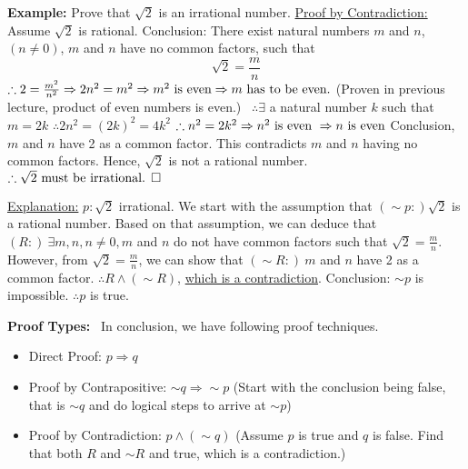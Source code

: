 \documentclass[letterpaper]{article}
\begin{document}
\textbf{Example:} Prove that $\sqrt{2}$ is an irrational number.
    \newline
    \underline{Proof by Contradiction:}~ Assume $\sqrt{2}$ is rational.
    \newline
    Conclusion: There exist natural numbers $m$ and $n$, $(n\neq 0)$, $m$ and $n$ have no common factors, such that
    \begin{equation*}
        \sqrt{2} = \frac{m}{n}
    \end{equation*}
    \newline
    $\therefore 2 = \frac{m^2}{n^2} \Rightarrow 2n^2 = m^2 \Rightarrow m^2\textnormal{ is even} \Rightarrow m \textnormal{ has to be even.}$ (Proven in previous lecture, product of even numbers is even.)\
    \newline
    $\therefore \exists$ a natural number $k$ such that $m=2k$
    \newline
    $\therefore 2n^2 = (2k)^2 = 4k^2$
    \newline
    $\therefore n^2 = 2k^2 \Rightarrow n^2 \textnormal{ is even } \Rightarrow n \textnormal{ is even}$
    \newline
    Conclusion, $m$ and $n$ have 2 as a common factor. This contradicts $m$ and $n$ having no common factors.
    \newline
    Hence, $\sqrt{2}$ is not a rational number.
    \newline
    $\therefore \sqrt{2} \textnormal{ must be irrational. } \square$


    \underline{Explanation:}
    \newline
    $p: \sqrt{2}$ irrational.
    \newline
    We start with the assumption that $(\sim p:) \sqrt{2}$ is a rational number.
    \newline
    Based on that assumption, we can deduce that $(R:)\ \exists m,n, n\neq 0, m$ and $n$ do not have common factors such that $\sqrt{2}=\frac{m}{n}$.
    \newline
    However, from $\sqrt{2}=\frac{m}{n}$, we can show that $(\sim R:)\ m$ and $n$ have 2 as a common factor.
    \newline
    $\therefore R \wedge (\sim R)$, \underline{which is a contradiction}.
    \newline
    Conclusion: $\sim p$ is impossible.
    \newline
    $\therefore p$ is true.

\textbf{Proof Types:}~ In conclusion, we have following proof techniques.
    \begin{itemize}
        \item Direct Proof: $p \Rightarrow q$
        \item Proof by Contrapositive: $\sim q \Rightarrow \sim p$
            \newline
	        (Start with the conclusion being false, that is $\sim q$ and do logical steps to arrive at $\sim p$)
        \item Proof by Contradiction: $p \wedge (\sim q)$
            \newline
	        (Assume $p$ is true and $q$ is false. Find that both $R$ and $\sim R$ and true, which is a contradiction.)
    \end{itemize}
\end{document}
